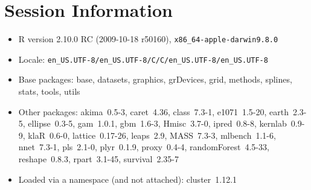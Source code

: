 \documentclass[12pt]{article}
\begin{document}
\section{Session Information}

\begin{itemize}\raggedright
  \item R version 2.10.0 RC (2009-10-18 r50160), \verb|x86_64-apple-darwin9.8.0|
  \item Locale: \verb|en_US.UTF-8/en_US.UTF-8/C/C/en_US.UTF-8/en_US.UTF-8|
  \item Base packages: base, datasets, graphics, grDevices, grid,
    methods, splines, stats, tools, utils
  \item Other packages: akima~0.5-3, caret~4.36, class~7.3-1,
    e1071~1.5-20, earth~2.3-5, ellipse~0.3-5, gam~1.0.1, gbm~1.6-3,
    Hmisc~3.7-0, ipred~0.8-8, kernlab~0.9-9, klaR~0.6-0,
    lattice~0.17-26, leaps~2.9, MASS~7.3-3, mlbench~1.1-6, nnet~7.3-1,
    pls~2.1-0, plyr~0.1.9, proxy~0.4-4, randomForest~4.5-33,
    reshape~0.8.3, rpart~3.1-45, survival~2.35-7
  \item Loaded via a namespace (and not attached): cluster~1.12.1
\end{itemize}
\end{document}

